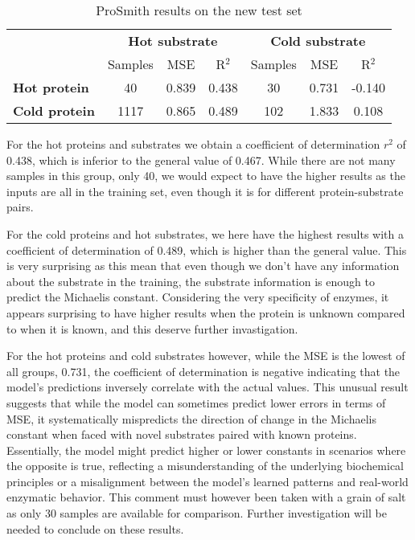 \begin{table}[ht]
  \centering
  \begin{tabular}{lcccccc}
  \hline
   & \multicolumn{3}{c}{\textbf{Hot substrate}} & \multicolumn{3}{c}{\textbf{Cold substrate}} \\
   & Samples & MSE & R\(^2\) & Samples & MSE & R\(^2\) \\ \hline
  \textbf{Hot protein}  & 40 & 0.839 & 0.438 & 30 & 0.731 & -0.140 \\
  \textbf{Cold protein} & 1117 & 0.865 & 0.489 & 102 & 1.833 & 0.108 \\ \hline
  \end{tabular}
  \caption{ProSmith results on the new test set}
  \label{tab:prosmith_results_new}
\end{table}

For the hot proteins and substrates we obtain a coefficient of determination $r^2$ of 0.438, which is inferior to the general value of 0.467. While there are not many samples in this group, only 40, we would expect to have the higher results as the inputs are all in the training set, even though it is for different protein-substrate pairs. 

For the cold proteins and hot substrates, we here have the highest results with a coefficient of determination of 0.489, which is higher than the general value. This is very surprising as this mean that even though we don't have any information about the substrate in the training, the substrate information is enough to predict the Michaelis constant. Considering the very specificity of enzymes, it appears surprising to have higher results when the protein is unknown compared to when it is known, and this deserve further invastigation.

For the hot proteins and cold substrates however, while the MSE is the lowest of all groups, 0.731, the coefficient of determination is negative indicating that the model's predictions inversely correlate with the actual values. This unusual result suggests that while the model can sometimes predict lower errors in terms of MSE, it systematically mispredicts the direction of change in the Michaelis constant when faced with novel substrates paired with known proteins. Essentially, the model might predict higher or lower constants in scenarios where the opposite is true, reflecting a misunderstanding of the underlying biochemical principles or a misalignment between the model's learned patterns and real-world enzymatic behavior. This comment must however been taken with a grain of salt as only 30 samples are available for comparison. Further investigation will be needed to conclude on these results. 

